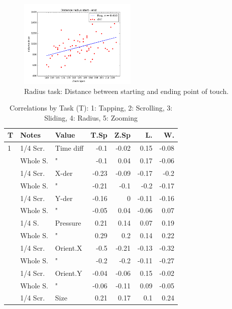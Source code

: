 \documentclass{sigchi}
\begin{document}
\begin{figure}[ht]
	\centering
  \includegraphics[width=0.5\textwidth]{figures/plotRadiusStartEnd.png}
	\caption{Radius task: Distance between starting and ending point of touch.}
	\label{plotRadiusStartEnd}
\end{figure}


\begin{table}[ht]
		\caption{Correlations by Task (T): 1: Tapping, 2: Scrolling, 3: Sliding, 4: Radius, 5: Zooming }
		\label{allCorrelations}
    \begin{tabular}{|lll|rrrr|}
    \hline
    T 	& Notes       & Value     & T.Sp  & Z.Sp   & L. & W. \\ \hline
    1    & 1/4 Scr.  	& Time diff & -0.1  & -0.02  & 0.15   & -0.08 \\
    ~    & Whole S.   & "         & -0.1  & 0.04   & 0.17   & -0.06 \\
    ~    & 1/4 Scr.  	& X-der     & -0.23 & -0.09  & -0.17  & -0.2  \\
    ~    & Whole S.   & "         & -0.21 & -0.1   & -0.2   & -0.17 \\
    ~    & 1/4 Scr.  	&  Y-der    & -0.16 & 0      & -0.11  & -0.16 \\
    ~    & Whole S.   & "         & -0.05 & 0.04   & -0.06  & 0.07  \\
    ~    & 1/4 S.  		& Pressure  & 0.21  & 0.14   & 0.07   & 0.19  \\
    ~    & Whole S.   & "         & 0.29  & 0.2    & 0.14   & 0.22  \\
    ~    & 1/4 Scr.  	& Orient.X  & -0.5  & -0.21  & -0.13  & -0.32 \\
    ~    & Whole S.   & "         & -0.2  & -0.2   & -0.11  & -0.27 \\
    ~    & 1/4 Scr.  	& Orient.Y  & -0.04 & -0.06  & 0.15   & -0.02 \\
    ~    & Whole S.   & "         & -0.06 & -0.11  & 0.09   & -0.05 \\
    ~    & 1/4 Scr.  	& Size      & 0.21  & 0.17   & 0.1    & 0.24  \\

\end{tabular}
\end{table}
\end{document}

